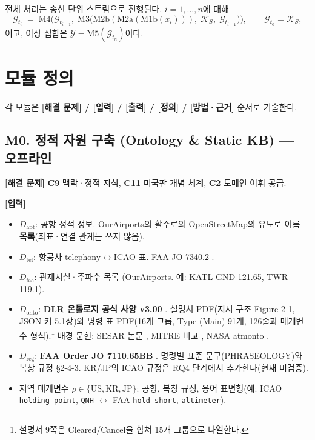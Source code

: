 \documentclass[10pt,a4paper]{article}
\newcommand{\G}{\mathcal{G}}
\newcommand{\KS}{\mathcal{K}_S}
\newcommand{\Yset}{\mathcal{Y}}
\newcommand{\cmd}[1]{\textsf{\small #1}}
\newcommand{\ch}[1]{\textbf{\textcolor{red!60!black}{#1}}}
\begin{document}
전체 처리는 송신 단위 스트림으로 진행된다. $i=1,\dots,n$에 대해
\begin{equation}
\G_{t_i} \;=\; \mathrm{M4}\Big(\G_{t_{i-1}},\; \mathrm{M3}\big(\mathrm{M2b}(\mathrm{M2a}(\mathrm{M1b}(x_i))),\; \KS,\; \G_{t_{i-1}}\big)\Big),
\qquad \G_{t_0} = \KS,
\end{equation}
이고, 이상 집합은 $\Yset = \mathrm{M5}(\G_{t_n})$이다.

\section{모듈 정의}\label{sec:modules}
각 모듈은 \textbf{[해결 문제] / [입력] / [출력] / [정의] / [방법·근거]} 순서로 기술한다.

\subsection{M0. 정적 자원 구축 (Ontology \& Static KB) --- 오프라인}
\textbf{[해결 문제]} \ch{C9} 맥락·정적 지식, \ch{C11} 미국판 개념 체계, \ch{C2} 도메인 어휘 공급.

\textbf{[입력]}
\begin{itemize}
\item $D_{\mathrm{apt}}$: 공항 정적 정보. OurAirports의 활주로와 OpenStreetMap의 유도로 이름 \textbf{목록}(좌표·연결 관계는 쓰지 않음).
\item $D_{\mathrm{tel}}$: 항공사 telephony$\leftrightarrow$ICAO 표. FAA JO 7340.2 \cite{faa7340}.
\item $D_{\mathrm{fac}}$: 관제시설·주파수 목록 (OurAirports. 예: KATL \cmd{GND} 121.65, \cmd{TWR} 119.1).
\item $D_{\mathrm{onto}}$: \textbf{DLR 온톨로지 공식 사양 v3.00} \cite{dlr2025}. 설명서 PDF(지시 구조 Figure 2-1, JSON 키 5.1장)와 명령 표 PDF(16개 그룹, Type (Main) 91개, 126줄과 매개변수 형식).\footnote{설명서 9쪽은 Cleared/Cancel을 합쳐 15개 그룹으로 나열한다.} 배경 문헌: SESAR 논문 \cite{helmke2018,kleinert2021}, MITRE 비교 \cite{chen2023}, NASA atmonto \cite{keller2017}.
\item $D_{\mathrm{reg}}$: \textbf{FAA Order JO 7110.65BB} \cite{faa7110}. 명령별 표준 문구(PHRASEOLOGY)와 복창 규정 §2-4-3. KR/JP의 ICAO 규정은 RQ4 단계에서 추가한다(현재 미검증).
\item 지역 매개변수 $\rho\in\{\mathrm{US},\mathrm{KR},\mathrm{JP}\}$: 공항, 복창 규정, 용어 표면형(예: ICAO \texttt{holding point}, \texttt{QNH} $\leftrightarrow$ FAA \texttt{hold short}, \texttt{altimeter}).
\end{itemize}
\end{document}
